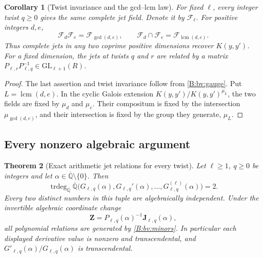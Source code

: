 \documentclass[11pt,a4paper]{article}
\newtheorem{theorem}{Theorem}[section]
\newtheorem{corollary}[theorem]{Corollary}
\theoremstyle{definition}
\theoremstyle{remark}
\numberwithin{equation}{section}
\begin{document}
\begin{corollary}[Twist invariance and the gcd--lcm law]
\label{B:bv:fieldlaw}
For fixed $\ell$, every integer twist $q\ge0$ gives the same
complete jet field. Denote it by $\mathcal F_\ell$.
For positive integers $d,e$,
\[
 \mathcal F_d\mathcal F_e=\mathcal F_{\gcd(d,e)},
 \qquad
 \mathcal F_d\cap\mathcal F_e=\mathcal F_{\operatorname{lcm}(d,e)}.
\]
Thus complete jets in any two coprime positive dimensions recover
$K(y,y')$. For a fixed dimension, the jets at twists $q$ and $r$
are related by a matrix
$P_{\ell,r}P_{\ell,q}^{-1}\in\mathrm{GL}_{\ell+1}(R)$.
\end{corollary}

\begin{proof}
The last assertion and twist invariance follow from
\eqref{B:bv:gauge}. Put $L=\operatorname{lcm}(d,e)$.
In the cyclic Galois extension
$K(y,y')/K(y,y')^{\mu_L}$, the two fields are fixed by
$\mu_d$ and $\mu_e$. Their compositum is fixed by the
intersection $\mu_{\gcd(d,e)}$, and their intersection is
fixed by the group they generate, $\mu_L$.
\end{proof}

\subsection{Every nonzero algebraic argument}

\begin{theorem}[Exact arithmetic jet relations for every twist]
\label{B:bv:values}
Let $\ell\ge1$, $q\ge0$ be integers and let
$\alpha\in\overline{\mathbb Q}\setminus\{0\}$. Then
\[
 \operatorname{trdeg}_{\overline{\mathbb Q}}
 \overline{\mathbb Q}\bigl(G_{\ell,q}(\alpha),
 G_{\ell,q}'(\alpha),\ldots,G_{\ell,q}^{(\ell)}(\alpha)\bigr)=2.
\]
Every two distinct numbers in this tuple are algebraically
independent. Under the invertible algebraic coordinate change
\[
 \mathbf Z=P_{\ell,q}(\alpha)^{-1}\mathbf J_{\ell,q}(\alpha),
\]
all polynomial relations are generated by \eqref{B:bv:minors}.
In particular each displayed derivative value is nonzero and
transcendental, and $G'_{\ell,q}(\alpha)/G_{\ell,q}(\alpha)$
is transcendental.
\end{theorem}
\end{document}
